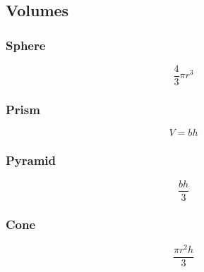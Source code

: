 \subsection{Volumes}
\subsubsection{Sphere}
$$ \dfrac{4}{3} \pi r^3 $$
\subsubsection{Prism}
$$ V = b h $$
\subsubsection{Pyramid}
$$ \dfrac{bh}{3} $$
\subsubsection{Cone}
$$ \dfrac{\pi r^2 h}{3} $$
